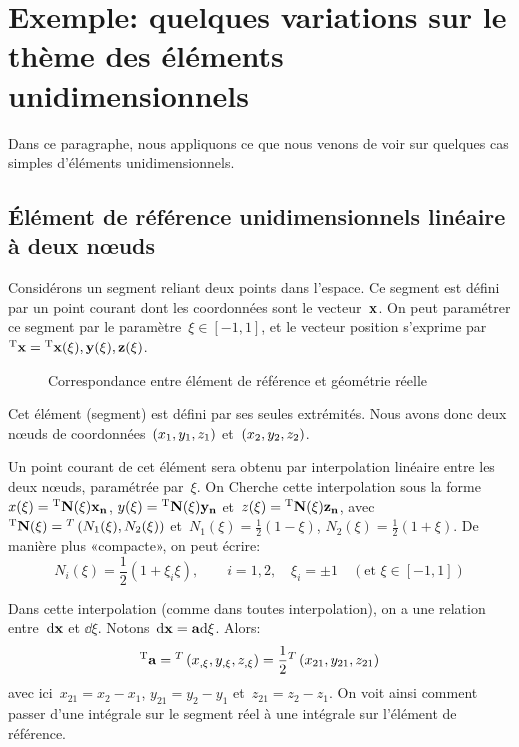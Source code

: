 \section{Exemple: quelques variations sur le thème des éléments unidimensionnels}
Dans ce paragraphe, nous appliquons ce que nous venons de voir sur quelques cas simples d'éléments unidimensionnels.

\medskipvm
\subsection{Élément de référence unidimensionnels linéaire à deux nœuds}\label{Sec-Elt1D2}

Considérons un segment reliant deux points dans l'espace.
Ce segment est défini par un point courant dont les coordonnées sont le vecteur~$\VV{x}$.
On peut paramétrer ce segment par le paramètre~$\xi \in [-1,1]$, et le vecteur
position s'exprime par~${}^\mathrm{T}\mathbf{x}={}^\mathrm{T}\mathbf{x(\xi), y(\xi), z(\xi)}$.
\begin{figure}[ht]\centering\small
    \hspace{5em}
   \caption{Correspondance entre élément de référence et géométrie réelle}\label{fig-e1rr}
\end{figure}
\ifVersionDuDocEstVincent

\medskipvm\fi
Cet élément (segment) est défini par ses seules extrémités. Nous avons donc deux
nœuds de coordonnées~$\left(x_1, y_1, z_1\right)$ et~$\left(x_2, y_2, z_2\right)$.\ifVersionDuDocEstVincent\par\fi
Un point courant de cet élément sera obtenu par interpolation linéaire entre les deux nœuds,
paramétrée par~$\xi$. On Cherche cette interpolation sous la forme~$x(\xi)=\LL{N(\xi)}\VV{x_n}$, $y(\xi)=\LL{N(\xi)}\VV{y_n}$ et~$z(\xi)=\LL{N(\xi)}\VV{z_n}$, avec
${}^\mathrm{T}\mathbf{N(\xi)}={}^T\left( N_1(\xi), N_2(\xi)\right)$ et~$N_1(\xi)=\frac12 (1-\xi)$, $N_2(\xi)=\frac12(1+\xi)$.
De manière plus «compacte», on peut écrire:
\begin{equation} N_i(\xi)=\frac12(1+\xi_i\xi), \qquad i=1,2, \quad \xi_i=\pm1 \quad (\text{et } \xi\in[-1,1]) \end{equation}
\ifVersionDuDocEstVincent

\medskipvm\fi
Dans cette interpolation (comme dans toutes interpolation), on a une relation entre~$\dd\VV{x}$ et
$ \dd \xi$. Notons~$\dd\VV{x} = \VV{a} \dd \xi$. Alors:
\begin{equation} {}^\mathrm{T}\mathbf{a} = {}^T\left( x_{,\xi}, y_{,\xi}, z_{,\xi}\right) = \frac12 {}^T\left( x_{21}, y_{21}, z_{21}\right)\end{equation}
avec ici~$x_{21}=x_2-x_1$, $y_{21}=y_2-y_1$ et~$z_{21}=z_2-z_1$.
On voit ainsi comment passer d'une intégrale sur le segment réel à une intégrale
sur l'élément de référence.

